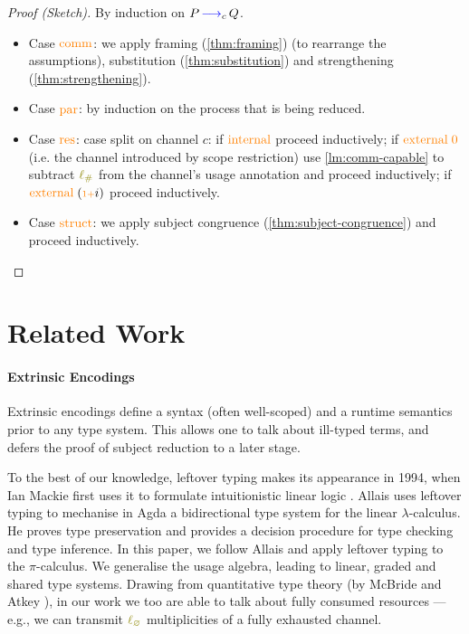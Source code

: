 \documentclass[sigplan,10pt,anonymous,review]{acmart}
\theoremstyle{definition}
\newcommand{\lambdacalc}{$\lambda$-calculus}
\newcommand{\picalc}{$\pi$-calculus}
\newcommand{\type}[1]{\textcolor{blue}{\operatorname{#1}}}
\newcommand{\constr}[1]{\textcolor{orange}{\operatorname{#1}}}
\newcommand{\func}[1]{\textcolor{olive}{\operatorname{#1}}}
\newcommand{\suc}{\constr{\scriptstyle 1+}}
\newcommand{\lz}{\func{\ell_{\varnothing}}}
\newcommand{\lio}{\func{\ell_{\#}}}
\newcommand{\reduce}[1]{\, \type{\longrightarrow}_{#1} \,}
\begin{document}
\begin{proof}[Proof (Sketch)]
  By induction on $P \reduce{c} Q$.
  \hfill{}\\
  \begin{itemize}
    \item
    Case $\constr{comm}$: we apply framing (\autoref{thm:framing}) (to rearrange the assumptions), substitution (\autoref{thm:substitution}) and strengthening (\autoref{thm:strengthening}).
  
    \item
    Case $\constr{par}$: by induction on the process that is being reduced.

    \item
    Case $\constr{res}$: case split on channel $c$:
    if $\constr{internal}$ proceed inductively;
    if $\constr{external}\; \constr{0}$ (i.e. the channel introduced by scope restriction) use \autoref{lm:comm-capable} to subtract $\lio$ from the channel's usage annotation and proceed inductively;
    if $\constr{external}\; (\suc i)$ proceed inductively.

    \item
    Case $\constr{struct}$: we apply subject congruence (\autoref{thm:subject-congruence}) and proceed inductively. \qedhere
  \end{itemize}
\end{proof}

\section{Related Work}

\paragraph{Extrinsic Encodings}

Extrinsic encodings define a syntax (often well-scoped) and a runtime semantics prior to any type system.
This allows one to talk about ill-typed terms, and defers the proof of subject reduction to a later stage.

To the best of our knowledge, leftover typing makes its appearance in 1994, when Ian Mackie first uses it to formulate intuitionistic linear logic \cite{Mackie}.
Allais \cite{Allais2018a} uses leftover typing to mechanise in Agda a bidirectional type system for the linear \lambdacalc{}.
He proves type preservation and provides a decision procedure for type checking and type inference.
In this paper, we follow Allais \cite{Allais2018a} and apply leftover typing to the \picalc{}.
We generalise the usage algebra, leading to linear, graded and shared type systems.
Drawing from quantitative type theory (by McBride and Atkey \cite{McBride2016, Atkey2018}), in our work we too are able to talk about fully consumed resources --- e.g., we can transmit $\lz$ multiplicities of a fully exhausted channel.
\end{document}
